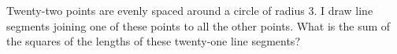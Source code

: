 Twenty-two points are evenly spaced around a circle of radius 3. I draw line segments joining one of these points to all the other points. What is the sum of the squares of the lengths of these twenty-one line segments?

